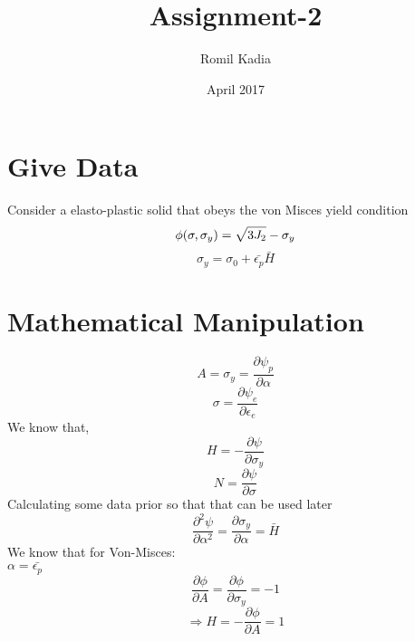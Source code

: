 \documentclass{article}
\title{Assignment-2}
\author{Romil Kadia}
\date{April 2017}
\begin{document}
\maketitle

\section{Give Data}
Consider a elasto-plastic solid that obeys the von Misces yield condition
\begin{equation}
    \phi (\sigma , \sigma_{y}) = \sqrt{3 J_{2}} - \sigma_{y}\\
\end{equation}
\begin{equation}
    \sigma_{y} = \sigma_{0} + \bar{\epsilon_{p}} \bar{H}
\end{equation}
\section{Mathematical Manipulation}
\begin{equation}
    A = \sigma_{y} = \frac{\partial \psi_{p}}{\partial \alpha}
\end{equation}
\begin{equation}
    \sigma=\frac{\partial \psi_{e}}{\partial \epsilon_{e}}
\end{equation}
We know that,
\begin{equation}
    H= - \frac{\partial \psi}{\partial \sigma_{y}}
\end{equation}
\begin{equation}
    N = \frac{\partial \psi}{\partial \sigma}
\end{equation}
Calculating some data prior so that that can be used later
\begin{equation}
    \frac{\partial^{2} \psi}{\partial \alpha^{2}}=\frac{\partial \sigma_{y}}{\partial \alpha} = \bar{H}
\end{equation}
We know that for Von-Misces:\\

$\alpha = \bar{\epsilon_{p}}$
\begin{equation}
    \frac{\partial \phi}{\partial A} = \frac{\partial \phi}{\partial \sigma_{y}}= -1
\end{equation}
\begin{equation}
    \Rightarrow H = - \frac{\partial \phi}{\partial A} = 1
\end{equation}
\pagebreak
\end{document}
